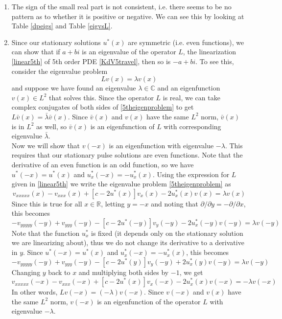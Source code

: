 \documentclass[12pt]{article}
\def\R{{\mathbb R}}
\def\C{{\mathbb C}}
\begin{document}
\begin{enumerate}

\item The sign of the small real part is not consistent, i.e. there seems to be no pattern as to whether it is positive or negative. We can see this by looking at Table \ref{dpeigs} and Table \ref{eigvsL}. 

\item Since our stationary solutions $u^*(x)$ are symmetric (i.e. even functions), we can show that if $a + bi$ is an eigenvalue of the operator $L$, the linearization \eqref{linear5th} of 5th order PDE \eqref{KdV5travel}, then so is $-a + bi$. To see this, consider the eigenvalue problem
\begin{equation}\label{5theigenproblem}
Lv(x) = \lambda v(x)
\end{equation}
and suppose we have found an eigenvalue $\lambda \in \C$ and an eigenfunction $v(x) \in L^2$ that solves this. Since the operator $L$ is real, we can take complex conjugates of both sides of \eqref{5theigenproblem} to get $L\bar{v}(x) = \bar{\lambda} \bar{v}(x)$. Since $\bar{v}(x)$ and $v(x)$ have the same $L^2$ norm, $\bar{v}(x)$ is in $L^2$ as well, so $\bar{v}(x)$ is an eigenfunction of $L$ with corresponding eigenvalue $\bar{\lambda}$.\\

Now we will show that $v(-x)$ is an eigenfunction with eigenvalue $-\lambda$. This requires that our stationary pulse solutions are even functions. Note that the derivative of an even function is an odd function, so we have $u^*(-x) = u^*(x)$ and $u_x^*(-x) = -u_x^*(x)$. Using the expression for $L$ given in \eqref{linear5th} we write the eigenvalue problem \eqref{5theigenproblem} as
\begin{equation*}
v_{xxxxx}(x) - v_{xxx}(x) + [c - 2 u^*(x)]v_x(x) - 2 u^*_x(x)v(x) = \lambda v(x)
\end{equation*}
Since this is true for all $x \in \R$, letting $y = -x$ and noting that $\partial / \partial y = -\partial / \partial x$, this becomes
\begin{equation*}
-v_{yyyyy}(-y) + v_{yyy}(-y) - [c - 2 u^*(-y)]v_y(-y) - 2 u^*_x(-y)v(-y) = \lambda v(-y)
\end{equation*}
Note that the function $u^*_x$ is fixed (it depends only on the stationary solution we are linearizing about), thus we do not change its derivative to a derivative in $y$. Since $u^*(-x) = u^*(x)$ and $u_x^*(-x) = -u_x^*(x)$, this becomes
\begin{equation*}
-v_{yyyyy}(-y) + v_{yyy}(-y) - [c - 2 u^*(y)]v_y(-y) + 2 u^*_x(y)v(-y) = \lambda v(-y)
\end{equation*}
Changing $y$ back to $x$ and multiplying both sides by $-1$, we get
\begin{equation*}
v_{xxxxx}(-x) - v_{xxx}(-x) + [c - 2 u^*(x)]v_x(-x) - 2 u^*_x(x)v(-x) = -\lambda v(-x)
\end{equation*}
In other words, $Lv(-x) = (-\lambda)v(-x)$. Since $v(-x)$ and $v(x)$ have the same $L^2$ norm, $v(-x)$ is an eigenfunction of the operator $L$ with eigenvalue $-\lambda$. \\


\end{enumerate}
\end{document}
